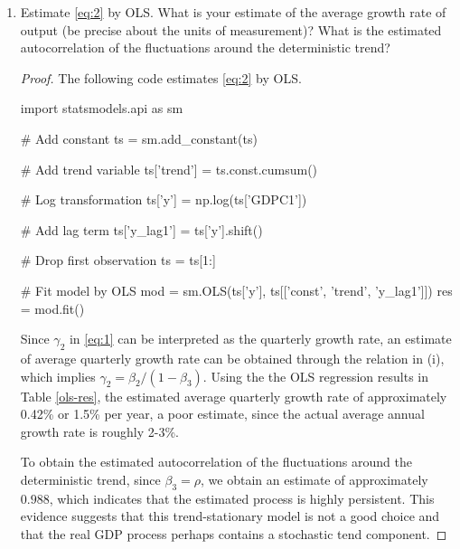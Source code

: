 \documentclass[oneside,reqno]{amsart}
\newcommand{\eps}{\varepsilon}
\theoremstyle{definition}
\begin{document}
\begin{enumerate}
\begin{proof}
Using lag operators, we can write
\[
	(1-\rho L)y_t = \eta_t
\]
and express \eqref{eq:1} as  
\[
	y_t = \gamma_1 + \gamma_2  t + (1-\rho L)^{-1} \eta_t,  
\]
provided $(1-\rho L)^{-1}$ exists. Then applying the quasi-difference operator $\Delta^\rho := (1-\rho L)$ to both sides gives 
\begin{align*}
	\Delta^\rho y_t &= (1-\rho L)(\gamma_1 + \gamma_2 t + (1-\rho L)^{-1} \eta_t)\\
	&= \gamma_1+ \gamma_2 t - \rho \gamma_1 - \rho \gamma_2(t-1) + \eta_t \\
	&=(1-\rho)\gamma_1 + \rho \gamma_2 + (1-\rho)\gamma_2 t + \eta_t
\end{align*}
or
\[
	y_t = (1-\rho)\gamma_1 + \rho \gamma_2 + (1-\rho)\gamma_2 t+ \rho y_{t-1} + \eta_t.
\]
Hence $(\beta_1, \beta_2, \beta_3, \sigma_\eps^2) = ( (1- \rho) \gamma_1 + \rho \gamma_2, (1-\rho)\gamma_2, \rho, \sigma_\eta^2)$.
\end{proof}

\item
Estimate \eqref{eq:2} by OLS. What is your estimate of the average growth rate of output (be precise about the units of measurement)? What is the estimated autocorrelation of the fluctuations around the deterministic trend?

\begin{proof}
The following code estimates \eqref{eq:2} by OLS.
\begin{python3code}
import statsmodels.api as sm

# Add constant
ts = sm.add_constant(ts)

# Add trend variable 
ts['trend'] = ts.const.cumsum()

# Log transformation
ts['y'] = np.log(ts['GDPC1'])

# Add lag term
ts['y_lag1'] = ts['y'].shift()

# Drop first observation
ts = ts[1:]

# Fit model by OLS
mod = sm.OLS(ts['y'], ts[['const', 'trend', 'y_lag1']])
res = mod.fit()
\end{python3code}

Since $\gamma_2$ in \eqref{eq:1} can be interpreted as the quarterly growth rate, an estimate of average quarterly growth rate can be obtained through the relation in (i), which implies $\gamma_2 = \beta_2/(1- \beta_3)$. Using the the OLS regression results in Table \ref{ols-res}, the estimated average quarterly growth rate of approximately 0.42\% or 1.5\% per year, a poor estimate, since the actual average annual growth rate is roughly 2-3\%. 
\par
To obtain the estimated autocorrelation of the fluctuations around the deterministic trend, since $\beta_3 = \rho$, we obtain an estimate of approximately $0.988$, which indicates that the estimated process is highly persistent. This evidence suggests that this trend-stationary model is not a good choice and that the real GDP process perhaps contains a stochastic tend component. 


\end{proof}
\end{enumerate}
\end{document}
